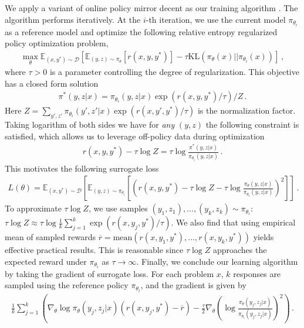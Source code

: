 \documentclass{article}
\newcommand{\citep}[1]{\parencite{#1}}
\begin{document}
We apply a variant of {online policy mirror decent} as our training algorithm \citep{abbasi2019politex,mei2019principled,tomar2020mirror}. 
The algorithm performs iteratively. 
At the $i$-th iteration, we use the current model $\pi_{\theta_i}$ as a reference model and optimize the following relative entropy regularized policy optimization problem,
\begin{align}
\max_\theta \mathbb{E}_{(x, y^*)\sim\mathcal{D}}\left[ \mathbb{E}_{(y, z)\sim\pi_\theta} \left[r(x, y, y^*)\right] - \tau \mathrm{KL} (\pi_{\theta}(x) || \pi_{\theta_i}(x))  \right]\, ,
\label{eq:opmd}
\end{align}
where $\tau > 0$ is a parameter controlling the degree of regularization. 
This objective has a closed form solution 
\begin{align*}
\pi^*(y, z | x) = \pi_{\theta_i}(y, z | x) \exp(r(x, y, y^*) / \tau) / Z\, .
\end{align*}
Here $Z=\sum_{y',z'} \pi_{\theta_i}(y', z' | x) \exp(r(x, y', y^*) / \tau)$ is the normalization factor. Taking logarithm of both sides we have for \emph{any} $(y, z)$ the following constraint is satisfied, which allows us to leverage off-policy data during optimization
\begin{align*}
r(x, y, y^*) - \tau \log Z = \tau \log \frac{\pi^*(y, z | x)} { \pi_{\theta_i}(y, z | x)}\, .
\end{align*}
This motivates the following surrogate loss
\begin{align*}
L(\theta) = \mathbb{E}_{(x,y^*)\sim\mathcal{D}}\left[ \mathbb{E}_{(y, z)\sim\pi_{\theta_i}} \left[  \left( r(x, y, y^*) - \tau \log Z - \tau \log \frac{\pi_\theta(y, z | x)}{{\pi}_{\theta_i}(y, z | x)} \right)^2 \right]\right] \, .
\end{align*}
To approximate $\tau\log Z$, we use samples $(y_1, z_1),\dots,(y_k,z_k)\sim \pi_{\theta_i}$: $\tau \log Z\approx \tau\log\frac{1}{k}\sum_{j=1}^k \exp(r(x, y_j, y^*)/\tau)$. 
We also find that using empirical mean of sampled rewards $\overline{r}=\mathrm{mean}(r(x,y_1,y^*),\dots,r(x, y_k, y^*)) $ yields effective practical results. 
This is reasonable since $\tau\log Z$ approaches the expected reward under $\pi_{\theta_i}$ as $\tau\rightarrow \infty$. 
Finally, we conclude our learning algorithm by taking the gradient of surrogate loss. 
For each problem $x$, $k$ responses are sampled using the reference policy $\pi_{\theta_i}$, 
and the gradient is given by
\begin{align}
\frac{1}{k} \sum_{j=1}^k \left( \nabla_\theta \log\pi_\theta (y_j, z_j | x) ( r(x, y_j, y^*) - \overline{r}) - \frac{\tau}{2} \nabla_{\theta} \left( \log \frac{\pi_\theta  (y_j, z_j | x) }{{\pi}_{\theta_i}  (y_j, z_j | x) } \right)^2 \right)\, .
\end{align}
\end{document}

